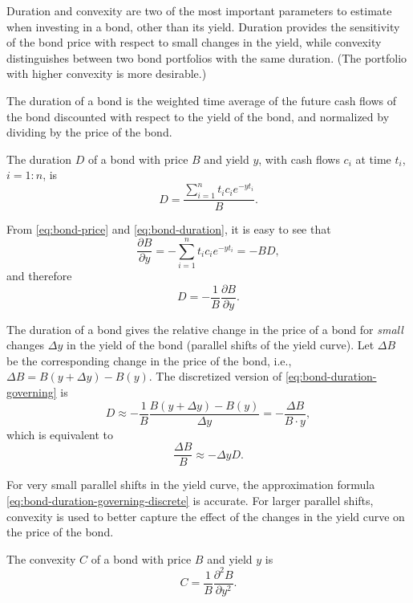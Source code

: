 Duration and convexity are two of the most important parameters to estimate
    when investing in a bond, other than its yield.
Duration provides the sensitivity of the bond price with respect to small
    changes in the yield, while convexity distinguishes between two bond
    portfolios with the same duration.
(The portfolio with higher convexity is more desirable.)

The duration of a bond is the weighted time average of the future cash flows of
    the bond discounted with respect to the yield of the bond, and normalized by
    dividing by the price of the bond.

\begin{definition}
    The duration $ D $ of a bond with price $ B $ and yield $ y $, with cash
        flows $ c_i $ at time $ t_i $, $ i = 1 : n $, is
    \begin{equation}
        D = \frac{\sum_{i=1}^{n} t_i c_i e^{-yt_i}}{B}.
        \label{eq:bond-duration}
    \end{equation}
\end{definition}

From \eqref{eq:bond-price} and \eqref{eq:bond-duration}, it is easy to see that
\begin{equation*}
    \frac{\partial B}{\partial y} = -\sum_{i=1}^{n} t_i c_i e^{-yt_i} = -B D,
\end{equation*}
and therefore
\begin{equation}
    D = -\frac{1}{B} \frac{\partial B}{\partial y}.
    \label{eq:bond-duration-governing}
\end{equation}

The duration of a bond gives the relative change in the price of a bond for
    \textit{small} changes $ \Delta y $ in the yield of the bond (parallel
    shifts of the yield curve).
Let $ \Delta B $ be the corresponding change in the price of the bond, i.e.,
    $ \Delta B = B(y + \Delta y) - B(y) $.
The discretized version of \eqref{eq:bond-duration-governing} is
\begin{equation*}
    D \approx -\frac{1}{B} \frac{B(y + \Delta y) - B(y)}{\Delta y} =
        -\frac{\Delta B}{B \cdot y},
\end{equation*}
which is equivalent to
\begin{equation}
    \frac{\Delta B}{B} \approx -\Delta y D.
    \label{eq:bond-duration-governing-discrete}
\end{equation}

For very small parallel shifts in the yield curve, the approximation formula
    \eqref{eq:bond-duration-governing-discrete} is accurate.
For larger parallel shifts, convexity is used to better capture the effect of
    the changes in the yield curve on the price of the bond.
\begin{definition}
    The convexity $ C $ of a bond with price $ B $ and yield $ y $ is
    \begin{equation}
        C = \frac{1}{B} \frac{\partial^2 B}{\partial y^2}.
        \label{eq:bond-convexity-governing}
    \end{equation}
\end{definition}

